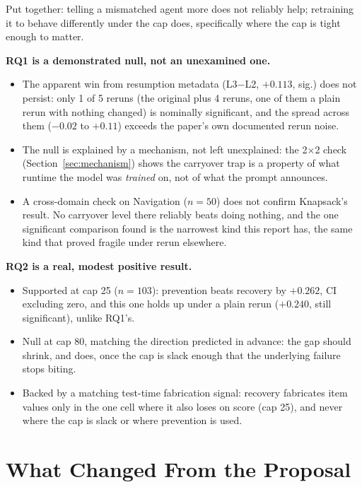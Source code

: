 \documentclass[11pt,a4paper]{article}
\begin{document}
Put together: telling a mismatched agent more does not reliably help; retraining it to behave
differently under the cap does, specifically where the cap is tight enough to matter.

\textbf{RQ1 is a demonstrated null, not an unexamined one.}
\begin{itemize}
\item The apparent win from resumption metadata (L3$-$L2, $+0.113$, sig.) does not persist: only
  1 of 5 reruns (the original plus 4 reruns, one of them a plain rerun with nothing changed) is
  nominally significant, and the spread across them ($-0.02$ to $+0.11$) exceeds the paper's own
  documented rerun noise.
\item The null is explained by a mechanism, not left unexplained: the 2$\times$2 check
  (Section~\ref{sec:mechanism}) shows the carryover trap is a property of what runtime the model
  was \emph{trained} on, not of what the prompt announces.
\item A cross-domain check on Navigation ($n=50$) does not confirm Knapsack's result. No
  carryover level there reliably beats doing nothing, and the one significant comparison found
  is the narrowest kind this report has, the same kind that proved fragile under rerun
  elsewhere.
\end{itemize}

\textbf{RQ2 is a real, modest positive result.}
\begin{itemize}
\item Supported at cap 25 ($n=103$): prevention beats recovery by $+0.262$, CI excluding zero,
  and this one holds up under a plain rerun ($+0.240$, still significant), unlike RQ1's.
\item Null at cap 80, matching the direction predicted in advance: the gap should shrink, and
  does, once the cap is slack enough that the underlying failure stops biting.
\item Backed by a matching test-time fabrication signal: recovery fabricates item values only in
  the one cell where it also loses on score (cap 25), and never where the cap is slack or where
  prevention is used.
\end{itemize}

\section{What Changed From the Proposal}
\label{sec:changes}
\end{document}
